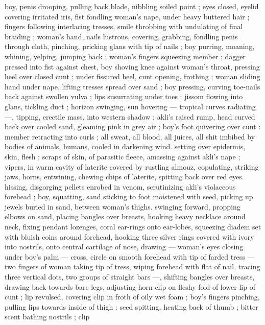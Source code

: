 boy, penis drooping, pulling back blade, nibbling soiled point ; eyes 
closed, eyelid covering irritated iris, fist fondling woman's nape, 
under heavy buttered hair ; fingers following interlacing tresses, 
smile throbbing with undulating of final braiding ; woman's hand, 
nails  lustrous, covering, grabbing, fondling penis through 
cloth, pinching, pricking glans with tip of nails ; boy purring, 
moaning, whining, yelping, jumping back ; woman's fingers 
squeezing member ; dagger pressed into fist against chest, boy 
shoving knee against woman's throat, pressing heel over closed cunt 
; under fissured heel, cunt opening, frothing ; woman sliding hand 
under nape, lifting tresses spread over sand ; boy pressing, curving 
toe-nails back against swollen vulva ; lips susurrating under toes : 
jissom flowing into glans, tickling duct ; horizon swinging, sun 
hovering --- tropical curves radiating ---, tipping, erectile mass, into 
western shadow ; akli's raised rump, head curved back over cooled 
sand, gleaming pink in grey air ; boy's foot quivering over cunt : 
member retracting into curls ; all sweat, all blood, all juices, all shit 
imbibed by bodies of animals, humans, cooled in darkening wind. 
setting over epidermis, skin, flesh ; scraps of skin, of parasitic 
fleece, amassing against akli's nape ; vipers, in warm cavity of 
laterite covered by rustling almouz, copulating, striking jaws, horns, 
entwining, chewing chips of laterite, spitting back over red eyes. 
hissing, disgorging pellets enrobed in venom, scrutinizing akli's 
violaceous forehead ; boy, squatting, sand sticking to foot moistened 
with seed, picking up jewels buried in sand, between woman's thighs. 
swinging forward, propping elbows on sand, placing bangles over 
breasts, hooking heavy necklace around neck, fixing pendant 
lozenges, coral ear-rings onto ear-lobes, squeezing diadem set with 
bluish coins around forehead, hooking three silver rings covered with 
ivory into nostrils, onto central cartilage of nose, drawing --- 
woman's eyes closing under boy's palm --- cross, circle on smooth 
forehead with tip of farded tress --- two fingers of woman taking tip 
of tress, wiping forehead with flat of nail, tracing three vertical dots, 
two groups of straight bars ---, shifting bangles over breasts, 
drawing back towards bare legs, adjusting horn clip on fleshy fold of 
lower lip of cunt ; lip revulsed, covering clip in froth of oily wet foam 
; boy's fingers pinching, pulling lips towards inside of thigh : seed 
spitting, heating back of thumb ; bitter scent bathing nostrils ; clip 
